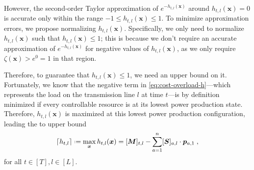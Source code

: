 \documentclass[conference]{IEEEtran}
\newcommand{\bp}{\boldsymbol{p}}
\newcommand{\bS}{\boldsymbol{S}}
\newcommand{\indices}[1]{[#1]}
\newcommand{\bx}{\boldsymbol{x}}
\newcommand{\maxload}{\boldsymbol{M}}
\newcommand{\fnorm}[1]{\left\lceil #1 \right\rceil}
\newcommand*{\defeq}{\mathrel{\vcenter{\baselineskip0.5ex\lineskiplimit0pt\hbox{\scriptsize.}\hbox{\scriptsize.}}}%
	=}
\begin{document}
However, the second-order Taylor approximation of $e^{-h_{t,l}(\bx)}$
around $h_{t,l}(\bx)=0$ is accurate only within the range
$-1\leq h_{t,l}(\bx)\leq 1$. To minimize approximation errors, we
propose normalizing $h_{t,l}(\bx)$. Specifically, we only need to
normalize $h_{t,l}(\bx)$ such that $h_{t,l}(\bx) \leq 1$; this is
because we don't require an accurate approximation of
$e^{-h_{t,l}(\bx)}$ for negative values of $h_{t,l}(\bx)$, as we only
require $\zeta(\bx) > e^{0}=1$ in that region.


Therefore, to guarantee that $h_{t,l}(\bx)\leq 1$, we need an upper
bound on it. Fortunately, we know that the negative term in
\cref{eq:cost-overload-h}---which represents the load on the
transmission line $l$ at time $t$---is by definition minimized if every
controllable resource is at its lowest power production
state. Therefore, $h_{t,l}(\bx)$ is maximized at this lowest power
production configuration, leading the to upper bound
\begin{equation}
  \label{eq:cost-overload-h-max}
  \fnorm{h_{t,l}} \defeq \max_{\bx} h_{t,l}(\bx) =
  [\maxload]_{t,l} - \sum_{a=1}^{n}[\bS]_{a,l}\cdot\bp_{a,1}\;,
\end{equation}
for all $t \in \indices{T}, l \in \indices{L}$.
\end{document}
